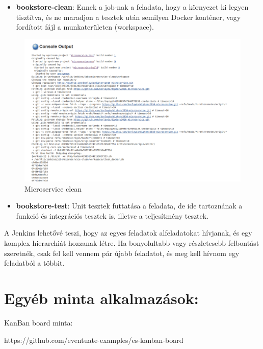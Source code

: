 \documentclass[11pt,magyar,a4paper,oneside,]{report}
\let\Oldincludegraphics\includegraphics
\renewcommand{\includegraphics}[1]{
\begin{adjustbox}{max size={\textwidth}{\textheight}}
    \Oldincludegraphics[scale=0.6]{#1}%
\end{adjustbox}
}
\begin{document}
\begin{itemize}
\itemsep1pt\parskip0pt
\item
  \textbf{bookstore-clean}: Ennek a job-nak a feladata, hogy a környezet
  ki legyen tisztítva, és ne maradjon a tesztek után semilyen Docker
  konténer, vagy fordított fájl a munkaterületen (workspace).
\end{itemize}

\begin{figure}[htbp]
\centering
\includegraphics{img/jenkins-clean.png}
\caption{Microservice clean}
\end{figure}

\begin{itemize}
\itemsep1pt\parskip0pt
\item
  \textbf{bookstore-test}: Unit tesztek futtatása a feladata, de ide
  tartoznának a funkció és integrációs tesztek is, illetve a
  teljesítmény tesztek.
\end{itemize}

A Jenkins lehetővé teszi, hogy az egyes feladatok alfeladatokat
hívjanak, és egy komplex hierarchiát hozzanak létre. Ha bonyolultabb
vagy részletesebb felbontást szeretnék, csak fel kell vennem pár újabb
feladatot, és meg kell hívnom egy feladatból a többit.

\section{Egyéb minta
alkalmazások:}\label{egyuxe9b-minta-alkalmazuxe1sok}

KanBan board minta:

https://github.com/eventuate-examples/es-kanban-board
\end{document}
